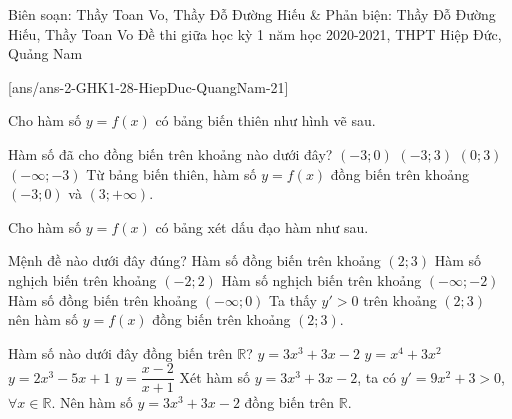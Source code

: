 \begin{name}
	{Biên soạn: Thầy Toan Vo, Thầy Đỗ Đường Hiếu \& Phản biện: Thầy Đỗ Đường Hiếu, Thầy Toan Vo}
	{Đề thi giữa học kỳ 1 năm học 2020-2021, THPT Hiệp Đức, Quảng Nam}
\end{name}
\setcounter{ex}{0}\setcounter{bt}{0}
[ans/ans-2-GHK1-28-HiepDuc-QuangNam-21]
\begin{ex}%
Cho hàm số $y=f(x)$ có bảng biến thiên như hình vẽ sau.
\begin{center}
\end{center}
Hàm số đã cho đồng biến trên khoảng nào dưới đây?
\choice
{\True $(-3;0)$}
{$(-3;3)$}
{$(0;3)$}
{$(-\infty;-3)$}
\loigiai
{
Từ bảng biến thiên, hàm số $y=f(x)$ đồng biến trên khoảng $(-3;0)$ và $(3;+\infty)$.
}
\end{ex}
\begin{ex}%
Cho hàm số $y=f(x)$ có bảng xét dấu đạo hàm như sau.
\begin{center}
\end{center}
Mệnh đề nào dưới đây đúng?
\choice
{\True Hàm số đồng biến trên khoảng $(2;3)$}
{Hàm số nghịch biến trên khoảng $(-2;2)$}
{Hàm số nghịch biến trên khoảng $(-\infty;-2)$}
{Hàm số đồng biến trên khoảng $(-\infty;0)$}
\loigiai
{
Ta thấy $y'>0$ trên khoảng $(2;3)$ nên hàm số $y=f(x)$ đồng biến trên khoảng $(2;3)$.
}
\end{ex}
\begin{ex}%
Hàm số nào dưới đây đồng biến trên $\mathbb{R}$?
\choice
{\True $y=3x^3+3x-2$}
{$y=x^4+3x^2$}
{$y=2x^3-5x+1$}
{$y=\dfrac{x-2}{x+1}$}
\loigiai
{
Xét hàm số $y=3x^3+3x-2$, ta có $y'=9x^2+3>0$, $\forall x\in\mathbb{R}$. Nên hàm số $y=3x^3+3x-2$ đồng biến trên $\mathbb{R}$.
}
\end{ex}
